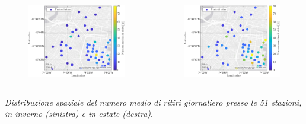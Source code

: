 \begin{frame}
	\centering
	\begin{columns}[T]
		\begin{column}[t]{0.5\linewidth}
			\centering
			\begin{figure}
				\includegraphics[width=\textwidth]{../Tesi/Immagini/4. Caso di studio/Mappe/Mappa ritiri, inverno}
			\end{figure}
		\end{column}
		\begin{column}[t]{0.5\linewidth}
			\centering
			\begin{figure}
				\includegraphics[width=\textwidth]{../Tesi/Immagini/4. Caso di studio/Mappe/Mappa ritiri, estate}
			\end{figure}
		\end{column}
	\end{columns}
	\textit{Distribuzione spaziale del numero medio di ritiri giornaliero presso le 51
	stazioni, in inverno (sinistra) e in estate (destra)}.
\end{frame}
